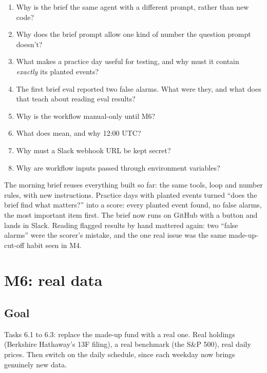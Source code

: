 \documentclass[11pt]{article}
\newcommand{\code}[1]{\texttt{\detokenize{#1}}}
\begin{document}
\begin{reviewq}
\begin{enumerate}
  \item Why is the brief the same agent with a different prompt, rather than new code?
  \item Why does the brief prompt allow one kind of number the question prompt doesn't?
  \item What makes a practice day useful for testing, and why must it contain \emph{exactly}
        its planted events?
  \item The first brief eval reported two false alarms. What were they, and what does that
        teach about reading eval results?
  \item Why is the workflow manual-only until M6?
  \item What does \code{0 12 * * 1-5} mean, and why 12:00 UTC?
  \item Why must a Slack webhook URL be kept secret?
  \item Why are workflow inputs passed through environment variables?
\end{enumerate}
\end{reviewq}

\begin{takeaway}
The morning brief reuses everything built so far: the same tools, loop and number rules, with
new instructions. Practice days with planted events turned ``does the brief find what
matters?'' into a score: every planted event found, no false alarms, the most important item
first. The brief now runs on GitHub with a button and lands in Slack. Reading flagged results by
hand mattered again: two ``false alarms'' were the scorer's mistake, and the one real issue was
the same made-up-cut-off habit seen in M4.
\end{takeaway}

\section{M6: real data}

\subsection{Goal}

Tasks 6.1 to 6.3: replace the made-up fund with a real one. Real holdings (Berkshire
Hathaway's 13F filing), a real benchmark (the S\&P 500), real daily prices. Then switch on the
daily schedule, since each weekday now brings genuinely new data.
\end{document}
